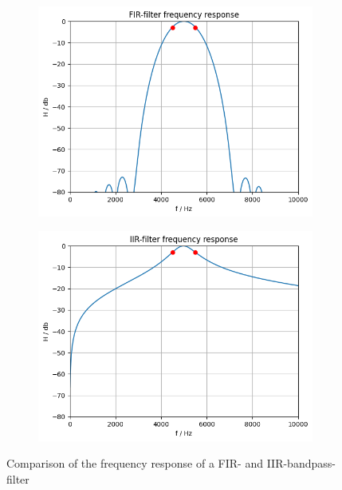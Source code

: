 \begin{figure}[!h]
    \centering
    \begin{subfigure}[c]{0.49\textwidth}
        \centering
        \includegraphics[width=\textwidth]{img/fir_bandpass.png}
    \end{subfigure}
    \begin{subfigure}[c]{0.49\textwidth}
        \centering
        \includegraphics[width=\textwidth]{img/iir_bandpass.png}
    \end{subfigure}
    \caption{Comparison of the frequency response of a \ac{FIR}- and \ac{IIR}-bandpass-filter}
    \label{fig:fir-iir-compare}
\end{figure}

